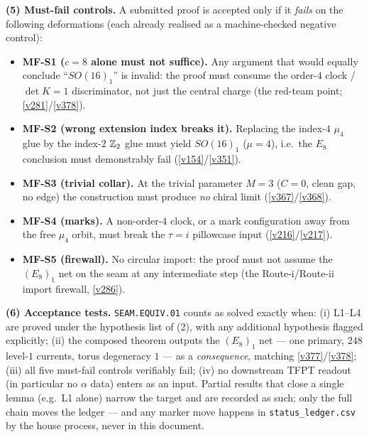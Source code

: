 \par\smallskip\noindent\textbf{(5) Must-fail controls.} A submitted proof is accepted only if it
\emph{fails} on the following deformations (each already realised as a machine-checked negative
control):
\begin{itemize}
\item \textbf{MF-S1 ($c=8$ alone must not suffice).} Any argument that would equally conclude
  ``$SO(16)_1$'' is invalid: the proof must consume the order-$4$ clock / $\det K=1$
  discriminator, not just the central charge (the red-team point; \vref{v281}/\vref{v378}).
\item \textbf{MF-S2 (wrong extension index breaks it).} Replacing the index-$4$ $\mu_4$ glue by
  the index-$2$ $\mathbb Z_2$ glue must yield $SO(16)_1$ ($\mu=4$), i.e.\ the $E_8$
  conclusion must demonstrably fail (\vref{v154}/\vref{v351}).
\item \textbf{MF-S3 (trivial collar).} At the trivial parameter $M=3$ ($C=0$, clean gap, no
  edge) the construction must produce \emph{no} chiral limit (\vref{v367}/\vref{v368}).
\item \textbf{MF-S4 (marks).} A non-order-$4$ clock, or a mark configuration away from the free
  $\mu_4$ orbit, must break the $\tau=i$ pillowcase input (\vref{v216}/\vref{v217}).
\item \textbf{MF-S5 (firewall).} No circular import: the proof must not assume the $(E_8)_1$ net
  on the seam at any intermediate step (the Route-i/Route-ii import firewall, \vref{v286}).
\end{itemize}

\par\smallskip\noindent\textbf{(6) Acceptance tests.} \texttt{SEAM.EQUIV.01} counts as solved
exactly when: (i) L1--L4 are proved under the hypothesis list of (2), with any additional
hypothesis flagged explicitly; (ii) the composed theorem outputs the $(E_8)_1$ net --- one
primary, $248$ level-$1$ currents, torus degeneracy $1$ --- as a \emph{consequence}, matching
\vref{v377}/\vref{v378}; (iii) all five must-fail controls verifiably fail; (iv) no downstream
TFPT readout (in particular no $\alpha$ data) enters as an input. Partial results that close a
single lemma (e.g.\ L1 alone) narrow the target and are recorded as such; only the full chain
moves the ledger --- and any marker move happens in \texttt{status\_ledger.csv} by the house
process, never in this document.

